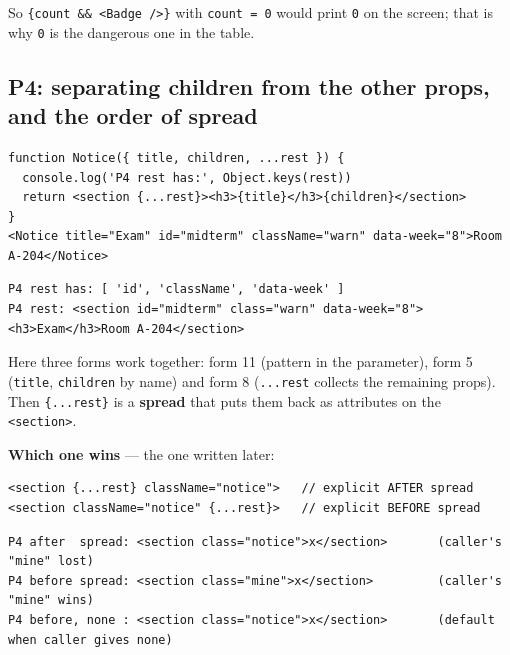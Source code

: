\documentclass[
  10pt,
]{article}
\begin{document}
So
\texttt{\{count\ \&\&\ \textless{}\allowbreak{}Badge\ /\allowbreak{}\textgreater{}\allowbreak{}\}}
with \texttt{count\ =\ 0} would print \texttt{0} on the screen; that is
why \texttt{0} is the dangerous one in the table.

\hypertarget{p4-separating-children-from-the-other-props-and-the-order-of-spread}{%
\subsection{P4: separating children from the other props, and the order
of
spread}\label{p4-separating-children-from-the-other-props-and-the-order-of-spread}}

\begin{verbatim}
function Notice({ title, children, ...rest }) {
  console.log('P4 rest has:', Object.keys(rest))
  return <section {...rest}><h3>{title}</h3>{children}</section>
}
<Notice title="Exam" id="midterm" className="warn" data-week="8">Room A-204</Notice>
\end{verbatim}

\begin{verbatim}
P4 rest has: [ 'id', 'className', 'data-week' ]
P4 rest: <section id="midterm" class="warn" data-week="8"><h3>Exam</h3>Room A-204</section>
\end{verbatim}

Here three forms work together: form 11 (pattern in the parameter), form
5 (\texttt{title}, \texttt{children} by name) and form 8
(\texttt{.\allowbreak{}.\allowbreak{}.\allowbreak{}rest} collects the
remaining props). Then
\texttt{\{.\allowbreak{}.\allowbreak{}.\allowbreak{}rest\}} is a
\textbf{spread} that puts them back as attributes on the
\texttt{\textless{}\allowbreak{}section\textgreater{}\allowbreak{}}.

\textbf{Which one wins} --- the one written later:

\begin{verbatim}
<section {...rest} className="notice">   // explicit AFTER spread
<section className="notice" {...rest}>   // explicit BEFORE spread
\end{verbatim}

\begin{verbatim}
P4 after  spread: <section class="notice">x</section>       (caller's "mine" lost)
P4 before spread: <section class="mine">x</section>         (caller's "mine" wins)
P4 before, none : <section class="notice">x</section>       (default when caller gives none)
\end{verbatim}
\end{document}
